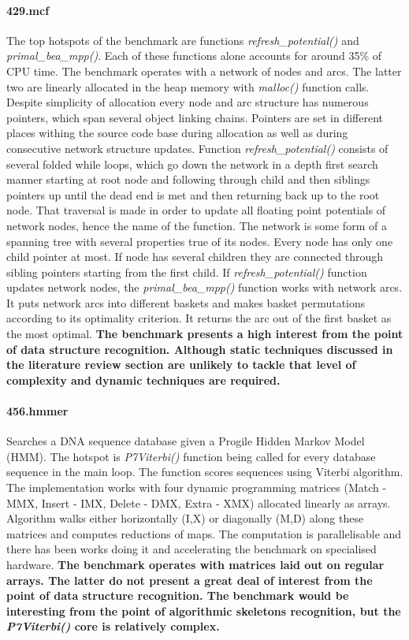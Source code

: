 \documentclass[10pt,a4paper]{report}
\begin{document}
\paragraph{429.mcf} The top hotspots of the benchmark are functions \textit{refresh\_potential()} and \textit{primal\_bea\_mpp()}. Each of these functions alone accounts for around 35\% of CPU time. The benchmark operates with a network of nodes and arcs. The latter two are linearly allocated in the heap memory with \textit{malloc()} function calls. Despite simplicity of allocation every node and arc structure has numerous pointers, which span several object linking chains. Pointers are set in different places withing the source code base during allocation as well as during consecutive network structure updates. Function \textit{refresh\_potential()} consists of several folded while loops, which go down the network in a depth first search manner starting at root node and following through child and then siblings pointers up until the dead end is met and then returning back up to the root node. That traversal is made in order to update all floating point potentials of network nodes, hence the name of the function. The network is some form of a spanning tree with several properties true of its nodes. Every node has only one child pointer at most. If node has several children they are connected through sibling pointers starting from the first child. If \textit{refresh\_potential()} function updates network nodes, the \textit{primal\_bea\_mpp()} function works with network arcs. It puts network arcs into different baskets and makes basket permutations according to its optimality criterion. It returns the arc out of the first basket as the most optimal.\newline\null
\quad\textbf{The benchmark presents a high interest from the point of data structure recognition. Although static techniques discussed in the literature review section are unlikely to tackle that level of complexity and dynamic techniques are required.}

\paragraph{456.hmmer} Searches a DNA sequence database given a Progile Hidden Markov Model (HMM). The hotspot is \textit{P7Viterbi()} function being called for every database sequence in the main loop. The function scores sequences using Viterbi algorithm. The implementation works with four dynamic programming matrices (Match - MMX, Insert - IMX, Delete - DMX, Extra - XMX) allocated linearly as arrays. Algorithm walks either horizontally (I,X) or diagonally (M,D) along these matrices and computes reductions of maps. The computation is parallelisable and there has been works doing it \cite{Ganesan:2010:AHG:1854776.1854844}\cite{inria} and accelerating the benchmark on specialised hardware.\newline\null
\quad\textbf{The benchmark operates with matrices laid out on regular arrays. The latter do not present a great deal of interest from the point of data structure recognition. The benchmark would be interesting from the point of algorithmic skeletons recognition, but the \textit{P7Viterbi()} core is relatively complex.} 
\end{document}

